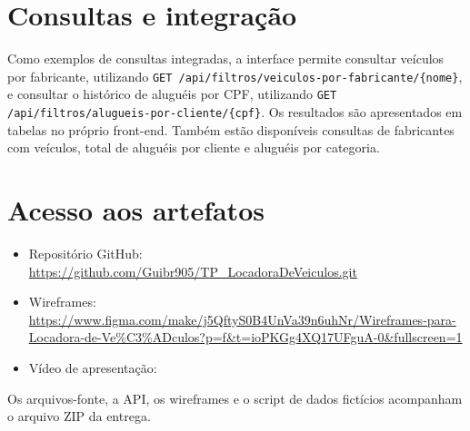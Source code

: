 \documentclass[12pt,a4paper]{article}
\begin{document}
\section{Consultas e integração}
Como exemplos de consultas integradas, a interface permite consultar veículos por fabricante, utilizando \texttt{GET /api/filtros/veiculos-por-fabricante/\{nome\}}, e consultar o histórico de aluguéis por CPF, utilizando \texttt{GET /api/filtros/alugueis-por-cliente/\{cpf\}}. Os resultados são apresentados em tabelas no próprio front-end. Também estão disponíveis consultas de fabricantes com veículos, total de aluguéis por cliente e aluguéis por categoria.

\section{Acesso aos artefatos}
\begin{itemize}
  \item Repositório GitHub: \url{https://github.com/Guibr905/TP_LocadoraDeVeiculos.git}
  \item Wireframes: \url{https://www.figma.com/make/j5QftyS0B4UnVa39n6uhNr/Wireframes-para-Locadora-de-Ve%C3%ADculos?p=f&t=ioPKGg4XQ17UFguA-0&fullscreen=1}
  \item Vídeo de apresentação: \url{}
\end{itemize}

\noindent Os arquivos-fonte, a API, os wireframes e o script de dados fictícios acompanham o arquivo ZIP da entrega.
\end{document}
